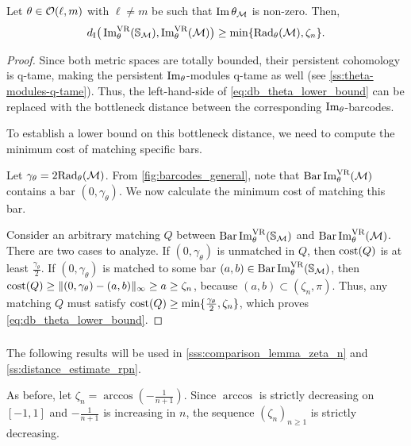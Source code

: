 \subsubsection{}\label{sss:db_theta_lower_bound}

\lemma
Let $\theta \in \mathcal{O}(\ell, m)$ with \(\ell \neq m\) be such that $\operatorname{Im} \theta_{\mathcal{M}}$ is non-zero.
Then,
\begin{equation}\label{eq:db_theta_lower_bound}
	d_{\mathrm{I}}\big(\operatorname{Im}^{\mathrm{VR}}_{\theta}(\mathbb{S}_{\mathcal{M}}), \operatorname{Im}^{\mathrm{VR}}_{\theta}(\mathcal{M})\big)
	\geq \min\{\mathrm{Rad}_{\theta}(\mathcal{M}), \zeta_n\}.
\end{equation}

\begin{proof}
	Since both metric spaces are totally bounded, their persistent cohomology is q-tame, making the persistent $\operatorname{Im}_\theta$-modules q-tame as well (see \cref{ss:theta-modules-q-tame}).
	Thus, the left-hand-side of \cref{eq:db_theta_lower_bound} can be replaced with the bottleneck distance between the corresponding $\operatorname{Im}_\theta$-barcodes.

	To establish a lower bound on this bottleneck distance, we need to compute the minimum cost of matching specific bars.

	Let \(\gamma_\theta = 2\mathrm{Rad}_{\theta}(\mathcal{M})\).
	From \cref{fig:barcodes_general}, note that \(\operatorname{Bar}\operatorname{Im}_{\theta}^{\mathrm{VR}} (\mathcal{M})\) contains a bar \((0, \gamma_\theta)\).
	We now calculate the minimum cost of matching this bar.

	Consider an arbitrary matching \(Q\) between \(\operatorname{Bar}\operatorname{Im}_{\theta}^{\mathrm{VR}} (\mathbb{S}_{\mathcal{M}})\) and \(\operatorname{Bar}\operatorname{Im}_{\theta}^{\mathrm{VR}} (\mathcal{M})\).
	There are two cases to analyze.
	If $(0,\gamma_\theta )$ is unmatched in $Q$, then $\mathrm{cost}(Q)$ is at least $ \tfrac{\gamma_\theta }{2}$.
	If $(0,\gamma_\theta )$ is matched to some bar $(a,b) \in \operatorname{Bar}\operatorname{Im}_{\theta}^{\mathrm{VR}} (\mathbb{S}_{\mathcal{M}})$, then
	$\mathrm{cost}(Q) \geq \|(0,\gamma_\theta ) - (a,b)\|_\infty \geq a \geq \zeta_n$, because $(a,b) \subset (\zeta_n, \pi)$.
	Thus, any matching $Q$ must satisfy $\mathrm{cost}(Q) \geq \min\{\tfrac{\gamma_\theta }{2}, \zeta_n\}$, which proves \cref{eq:db_theta_lower_bound}.
\end{proof}

\subsubsection{}\label{sss:comparison_lemma}

The following results will be used in \cref{sss:comparison_lemma_zeta_n} and \cref{ss:distance_estimate_rpn}.

As before, let $\zeta_n = \arccos\!\left(-\tfrac{1}{n+1}\right)$.
Since $\arccos$ is strictly decreasing on $[-1,1]$ and $-\frac{1}{n+1}$ is increasing in $n$, the sequence $(\zeta_n)_{n\ge 1}$ is strictly decreasing.

